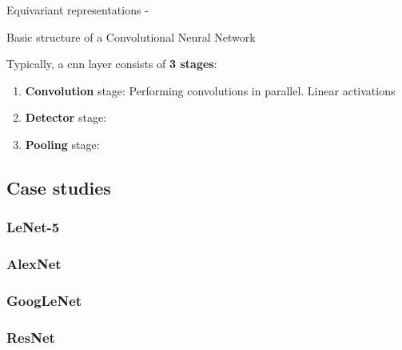 \begin{frame}[t,allowframebreaks]{Equivariant representations -}

\end{frame}

%
%
%

\begin{frame}[t]{Basic structure of a Convolutional Neural Network}

    Typically, a \gls{cnn} layer
    consists of {\bf 3 stages}:
    \begin{enumerate}
        \item {\bf Convolution} stage:
           Performing convolutions in parallel. 
           Linear activations           
        \item {\bf Detector} stage:
        \item {\bf Pooling} stage:
    \end{enumerate}

\end{frame}

\subsection{Case studies}


\subsubsection{LeNet-5}

\subsubsection{AlexNet}

\subsubsection{GoogLeNet}

\subsubsection{ResNet}
